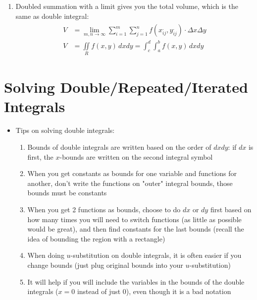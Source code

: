 \documentclass{article}
\begin{document}
\begin{itemize}
\begin{enumerate}
    \item Doubled summation with a limit gives you the total volume, which is the same as double integral:
    \begin{align}
      \begin{split}
        V &= \lim_{m,n \to \infty} \sum_{i = 1}^{m} \sum_{j = 1}^{n} f(x_{ij}^{.}, y_{ij}^{.})\cdot\Delta x \Delta y \\
        V &= \iint\limits_R f(x,y) \, dxdy = \int^{d}_{c} \int^{b}_{a} f(x,y) \, dxdy
      \end{split}
    \end{align}
  \end{enumerate}
\end{itemize}


\section{Solving Double/Repeated/Iterated Integrals}
\begin{itemize}
  \item Tips on solving double integrals:
  \begin{enumerate}
    \item Bounds of double integrals are written based on the order of $dxdy$: if $dx$ is first, the $x$-bounds are written on the second integral symbol
    \item When you get constants as bounds for one variable and functions for another, don't write the functions on "outer" integral bounds, those bounds must be constants
    \item When you get 2 functions as bounds, choose to do $dx$ or $dy$ first based on how many times you will need to switch functions (as little as possible would be great), and then find constants for the last bounds (recall the idea of bounding the region with a rectangle)
    \item When doing $u$-substitution on double integrals, it is often easier if you change bounds (just plug original bounds into your $u$-substitution)
    \item It will help if you will include the variables in the bounds of the double integrals ($x = 0$ instead of just $0$), even though it is a bad notation
  \end{enumerate}
\end{itemize}
\end{document}
